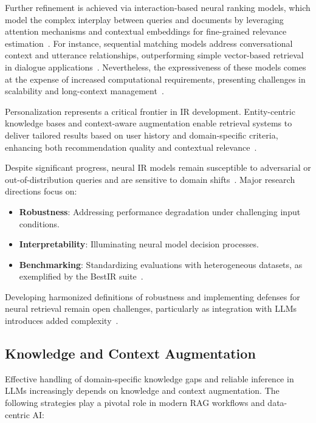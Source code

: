 Further refinement is achieved via interaction-based neural ranking models, which model the complex interplay between queries and documents by leveraging attention mechanisms and contextual embeddings for fine-grained relevance estimation~\cite{ref5,ref8,ref10,ref14,ref15,ref16,ref17,ref22,ref26,ref28,ref36,ref37,ref38,ref43,ref52,ref54,ref55}. For instance, sequential matching models address conversational context and utterance relationships, outperforming simple vector-based retrieval in dialogue applications~\cite{ref43}. Nevertheless, the expressiveness of these models comes at the expense of increased computational requirements, presenting challenges in scalability and long-context management~\cite{ref54,ref55}.

Personalization represents a critical frontier in IR development. Entity-centric knowledge bases and context-aware augmentation enable retrieval systems to deliver tailored results based on user history and domain-specific criteria, enhancing both recommendation quality and contextual relevance~\cite{ref8,ref10,ref14,ref15,ref17,ref26,ref28,ref38,ref43,ref52,ref54}.

Despite significant progress, neural IR models remain susceptible to adversarial or out-of-distribution queries and are sensitive to domain shifts~\cite{ref7,ref20,ref46,ref54,ref63,ref64}. Major research directions focus on:

\begin{itemize}
  \item \textbf{Robustness}: Addressing performance degradation under challenging input conditions.
  \item \textbf{Interpretability}: Illuminating neural model decision processes.
  \item \textbf{Benchmarking}: Standardizing evaluations with heterogeneous datasets, as exemplified by the BestIR suite~\cite{ref7,ref63,ref64}.
\end{itemize}

Developing harmonized definitions of robustness and implementing defenses for neural retrieval remain open challenges, particularly as integration with LLMs introduces added complexity~\cite{ref7,ref63,ref64}.

\subsection{Knowledge and Context Augmentation}

Effective handling of domain-specific knowledge gaps and reliable inference in LLMs increasingly depends on knowledge and context augmentation. The following strategies play a pivotal role in modern RAG workflows and data-centric AI:

